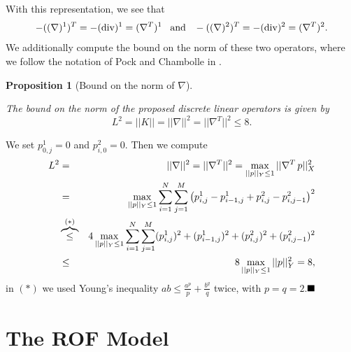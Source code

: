 \documentclass[abstracton]{scrreprt}
\newcommand{\qed}{$\hfill\blacksquare$}
\newtheorem{proposition}[theorem]{Proposition}
\newenvironment{proof}[1][Proof]{\begin{trivlist}
\item[\hskip \labelsep {\bfseries #1}]}{\end{trivlist}}
\begin{document}
        With this representation, we see that 
            $$
                -((\nabla)^{1})^{T} = -(\textnormal{div})^{1} = (\nabla^{T})^{1} \,\,\,\,\, \textnormal{and} \,\,\,\,\, -((\nabla)^{2})^{T} = -(\textnormal{div})^{2} = (\nabla^{T})^{2}.
            $$
        We additionally compute the bound on the norm of these two operators, where we follow the notation of Pock and Chambolle in \cite{Chambolle10afirst-order}.
        \begin{proposition}[Bound on the norm of $\nabla$] %
            \label{prop:bound_on_the_norm}

            The bound on the norm of the proposed discrete linear operators is given by
                $$
                    L^{2} = ||K|| = ||\nabla||^{2} = ||\nabla^{T}||^{2} \le 8.
                $$
        \end{proposition}
        \begin{proof} %
            We set $p^{1}_{0,j} = 0$ and $p^{2}_{i,0} = 0$. Then we compute
                \begin{eqnarray}
                    L^{2} &=& ||\nabla||^{2} = ||\nabla^{T}||^{2} = \max_{||p||_{Y} \le 1} ||\nabla^{T}\,p||^{2}_{X} \notag \\
                    &=& \max_{||p||_{Y} \le 1} \sum_{i = 1}^{N} \sum_{j = 1}^{M} \left( p^{1}_{i, j} - p^{1}_{i-1, j} + p^{2}_{i, j} - p^{2}_{i, j-1} \right)^{2} \notag \\
                    &\overbrace{\le}^{(\ast)}& 4 \max_{||p||_{Y} \le 1} \sum_{i = 1}^{N} \sum_{j = 1}^{M} (p^{1}_{i, j})^{2} + (p^{1}_{i-1, j})^{2} + (p^{2}_{i, j})^{2} + (p^{2}_{i, j-1})^{2} \notag \\
                    &\le& 8 \max_{||p||_{Y} \le 1} ||p||^{2}_{Y} = 8, \notag
                \end{eqnarray}
            in $(\ast)$ we used Young's inequality $ab \le \frac{a^{p}}{p} + \frac{b^{q}}{q}$ twice, with $p = q = 2$.\qed
        \end{proof}

    \section{The ROF Model} %
    \label{sec:the_rof_model}
        
\end{document}
